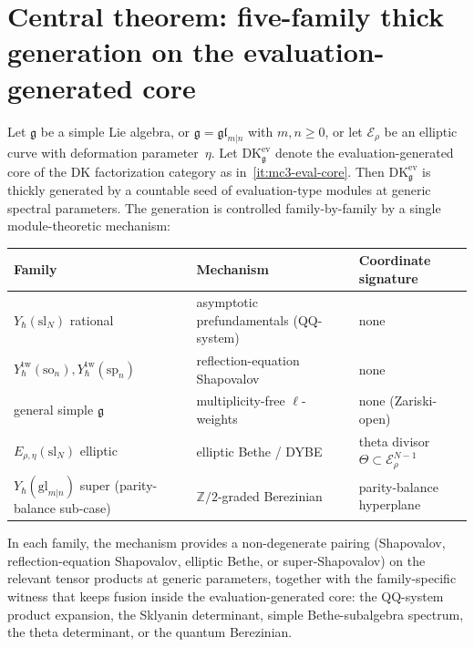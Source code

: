 \section{Central theorem: five-family thick generation on the evaluation-generated core}
\label{sec:mc3-platonic-central-theorem}

\begin{theorem}
\label{thm:mc3-evaluation-core-five-family}
Let $\mathfrak{g}$ be a simple Lie algebra, or
$\mathfrak{g} = \mathfrak{gl}_{m|n}$ with $m,n \ge 0$, or
let $\mathcal{E}_\rho$ be an elliptic curve with deformation
parameter~$\eta$. Let $\mathrm{DK}^{\mathrm{ev}}_\mathfrak{g}$
denote the evaluation-generated core of the DK factorization
category as in~\ref{it:mc3-eval-core}.
Then $\mathrm{DK}^{\mathrm{ev}}_\mathfrak{g}$ is thickly generated
by a countable seed of evaluation-type modules at generic spectral
parameters. The generation is controlled family-by-family by a
single module-theoretic mechanism:
\begin{center}
\renewcommand{\arraystretch}{1.2}
\begin{tabular}{lll}
\toprule
\textbf{Family} & \textbf{Mechanism} & \textbf{Coordinate signature} \\
\midrule
$Y_\hbar(\mathrm{sl}_N)$ rational
 & asymptotic prefundamentals \textup{(}QQ-system\textup{)}
 & none \\
$Y^{\mathrm{tw}}_\hbar(\mathrm{so}_n),Y^{\mathrm{tw}}_\hbar(\mathrm{sp}_n)$
 & reflection-equation Shapovalov
 & none \\
general simple $\mathfrak{g}$
 & multiplicity-free $\ell$-weights
 & none \textup{(}Zariski-open\textup{)} \\
$E_{\rho,\eta}(\mathrm{sl}_N)$ elliptic
 & elliptic Bethe / DYBE
 & theta divisor $\Theta \subset \mathcal{E}_\rho^{N-1}$ \\
$Y_\hbar(\mathrm{gl}_{m|n})$ super (parity-balance sub-case)
 & $\mathbb{Z}/2$-graded Berezinian
 & parity-balance hyperplane \\
\bottomrule
\end{tabular}
\end{center}
In each family, the mechanism provides a non-degenerate pairing
(Shapovalov, reflection-equation Shapovalov, elliptic Bethe, or
super-Shapovalov) on the relevant tensor products at generic
parameters, together with the family-specific witness that keeps
fusion inside the evaluation-generated core: the QQ-system product
expansion, the Sklyanin determinant, simple Bethe-subalgebra spectrum,
the theta determinant, or the quantum Berezinian.
\end{theorem}

